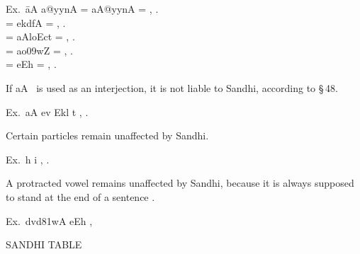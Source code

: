 \begin{tabbing}
  Ex.\ \={\dn aA a@yynA} = {\dn aA@yynA}  =
  , .\\
   = {\dn e\?kd\?fA}  = ,
  .\\
   = {\dn aAloEct\2}  = ,
  .\\
   = {\dn ao\309wZ\2}  = , .\\
   = {\dn eEh}  = , .
\end{tabbing}

If {\dn aA}~ is used as an interjection, it is not liable to Sandhi,
according to \S\,48.

Ex.\ {\dn aA ev\2 Ekl t} , .

\s Certain particles remain unaffected by Sandhi.

Ex.\ {\dn h\? i\2} , .

\s A protracted vowel remains unaffected by Sandhi, because it is always
supposed to stand at the end of a sentence .

Ex.\ {\dn d\?vd\381wA eEh} , 

SANDHI TABLE

